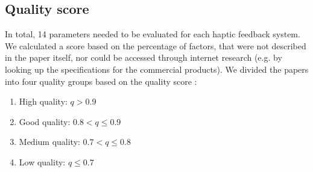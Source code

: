 \subsection{Quality score}
\label{sec:quality}
In total, 14 parameters needed to be evaluated for each haptic feedback system. We calculated a score based on the percentage of factors, that were not described in the paper itself, nor could be accessed through internet research (e.g. by looking up the specifications for the commercial products).
We divided the papers into four quality groups based on the quality score :

\begin{enumerate}
	\item High quality: $q > 0.9$
	\item Good quality: $0.8 < q \leq 0.9$
	\item Medium quality: $0.7 < q \leq 0.8$
	\item Low quality: $q \leq 0.7$
\end{enumerate}